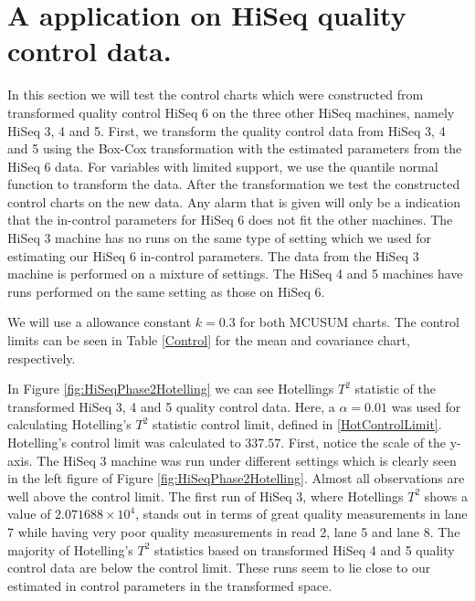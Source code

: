 \documentclass[a4paper,11pt,fleqn,twoside,notitlepage]{report}\usepackage[]{graphicx}\usepackage[]{color}
\begin{document}
\section{A application on HiSeq quality control data.}





In this section we will test the control charts which were constructed from transformed quality control HiSeq 6 on the three other HiSeq machines, namely HiSeq 3, 4 and 5. First, we transform the quality control data from HiSeq 3, 4 and 5 using the Box-Cox transformation with the estimated parameters from the HiSeq 6 data. For variables with limited support, we use the quantile normal function to transform the data. After the transformation we test the constructed control charts on the new data. Any alarm that is given will only be a indication that the in-control parameters for HiSeq 6 does not fit the other machines. 
The HiSeq 3 machine has no runs on the same type of setting which we used for estimating our HiSeq 6 in-control parameters. The data from the HiSeq 3 machine is performed on a mixture of settings. The HiSeq 4 and 5 machines have runs performed on the same setting as those on HiSeq 6.



We will use a allowance constant $k=0.3$ for both MCUSUM charts. The control limits can be seen in Table \ref{Control} for the mean and covariance chart, respectively.

In Figure \ref{fig:HiSeqPhase2Hotelling} we can see Hotellings $T^2$ statistic of the transformed HiSeq 3, 4 and 5 quality control data. Here, a $\alpha=0.01$ was used for calculating Hotelling's $T^2$ statistic control limit, defined in \eqref{HotControlLimit}. Hotelling's control limit was calculated to $337.57$. First, notice the scale of the y-axis. The HiSeq 3 machine was run under different settings which is clearly seen in the left figure of Figure \ref{fig:HiSeqPhase2Hotelling}. Almost all observations are well above the control limit. The first run of HiSeq 3, where Hotellings $T^2$ shows a value of $\ensuremath{2.071688\times 10^{4}}$, stands out in terms of great quality measurements in lane 7 while having very poor quality measurements in read 2, lane 5 and lane 8. The majority of Hotelling's $T^2$ statistics based on transformed HiSeq 4 and 5 quality control data are below the control limit. These runs seem to lie close to our estimated in control parameters in the transformed space.
\end{document}
